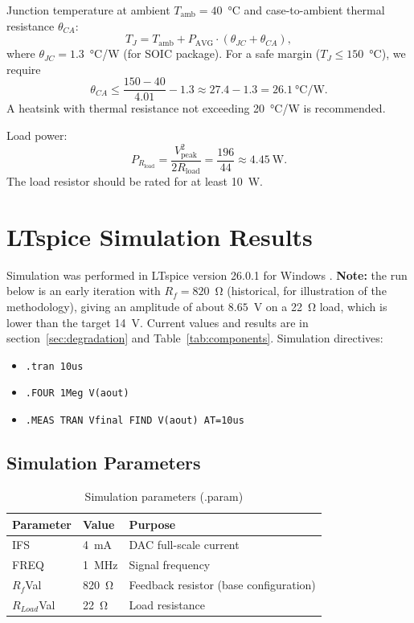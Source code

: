 \documentclass[a4paper, 12pt]{article}
\begin{document}
Junction temperature at ambient \(T_{\text{amb}} = 40\)~°C
and case-to-ambient thermal resistance \(\theta_{CA}\):
\[
    T_J = T_{\text{amb}} + P_{\text{AVG}} \cdot (\theta_{JC} + \theta_{CA}),
\]
where \(\theta_{JC} = 1.3\)~°C/W (for SOIC package).
For a safe margin (\(T_J \le 150\)~°C), we require
\[
    \theta_{CA} \le \frac{150 - 40}{4.01} - 1.3 \approx 27.4 - 1.3 = 26.1\ \text{°C/W}.
\]
A heatsink with thermal resistance not exceeding 20~°C/W is recommended.

Load power:
\[
    P_{R_{\text{load}}} = \frac{V_{\text{peak}}^2}{2R_{\text{load}}}
    = \frac{196}{44} \approx 4.45\ \text{W}.
\]
The load resistor should be rated for at least 10~W.

\section{LTspice Simulation Results}

Simulation was performed in LTspice version 26.0.1 for Windows \cite{LTspice}.
\textbf{Note:} the run below is an early iteration with \(R_f = 820\)~Ω
(historical, for illustration of the methodology), giving an amplitude of
about \(8.65\)~V on a 22~Ω load, which is lower than the target 14~V.
Current values and results are in section~\ref{sec:degradation} and
Table~\ref{tab:components}.
Simulation directives:
\begin{itemize}
  \item \texttt{.tran 10us}
  \item \texttt{.FOUR 1Meg V(aout)}
  \item \texttt{.MEAS TRAN Vfinal FIND V(aout) AT=10us}
\end{itemize}

\subsection{Simulation Parameters}

\begin{table}[H]
\centering
\caption{Simulation parameters (.param)}
\label{tab:params}
\begin{tabular}{@{}lll@{}}
\toprule
\textbf{Parameter} & \textbf{Value} & \textbf{Purpose} \\
\midrule
IFS   & 4~mA   & DAC full-scale current \\
FREQ  & 1~MHz  & Signal frequency \\
\(R_f\)Val & 820~Ω & Feedback resistor (base configuration) \\
\(R_{Load}\)Val & 22~Ω & Load resistance \\
\bottomrule
\end{tabular}
\end{table}
\end{document}
